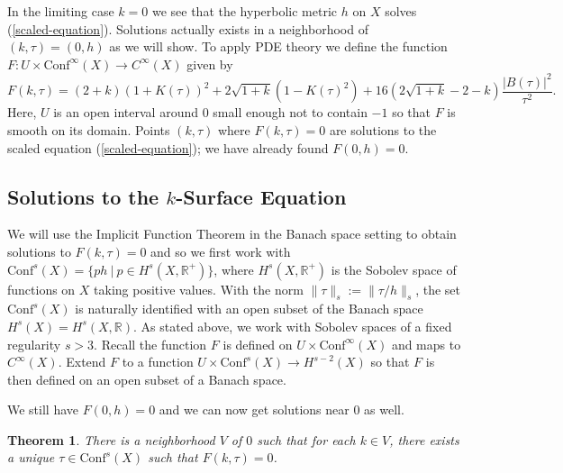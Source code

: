 \documentclass{amsart}
\newcommand{\R}{\mathbb{R}}
\newtheorem{thm}{Theorem}[section]
\begin{document}
In the limiting case $k=0$ we see that the hyperbolic metric $h$ on $X$ solves (\ref{scaled-equation}). 
Solutions actually exists in a neighborhood of $(k,\tau) = (0,h)$ as we will show.
To apply PDE theory we define the function $F : U \times \mathrm{Conf}^\infty(X) \to C^\infty(X)$ given by 
\[
F(k,\tau) = (2+k)(1+K(\tau))^2 + 2\sqrt{1+k}\left(1-K(\tau)^2 \right) +16\left(2\sqrt{1+k} - 2 - k  \right)\frac{|B(\tau)|^2}{\tau^2}.
\]
Here, $U$ is an open interval around $0$ small enough not to contain $-1$ so that $F$ is smooth on its domain. 
Points $(k,\tau)$ where $F(k,\tau) = 0$ are solutions to the scaled equation (\ref{scaled-equation}); we have already found $F(0,h) = 0$.
 
 
 
\subsection{Solutions to the $k$-Surface Equation} 



We will use the Implicit Function Theorem in the Banach space setting to obtain solutions to $F(k,\tau) = 0$ and so we first work with $\mathrm{Conf}^s(X) = \{ p h \ |\ p \in H^s(X,\R^+)\}$, where $H^s(X,\R^+)$ is the Sobolev space of functions on $X$ taking positive values.
With the norm $\|\tau\|_s := \| \tau/h\|_s$, the set $\mathrm{Conf}^s(X)$ is naturally identified with an open subset of the Banach space $H^s(X) = H^{s}(X,\R)$.
As stated above, we work with Sobolev spaces of a fixed regularity $s > 3$.
Recall the function $F$ is defined on $U \times \mathrm{Conf}^\infty(X)$ and maps to $C^\infty(X)$. 
Extend $F$ to a function $U \times \mathrm{Conf}^s(X) \to H^{s-2}(X)$ so that $F$ is then defined on an open subset of a Banach space. 

We still have $F(0,h) = 0$ and we can now get solutions near $0$ as well.



\begin{thm}
\label{weak-solutions}
There is a neighborhood $V$ of $0$ such that for each $k \in V$, there exists a unique $\tau \in \mathrm{Conf}^s(X)$ such that $F(k,\tau) = 0$.
\end{thm}
\end{document}

